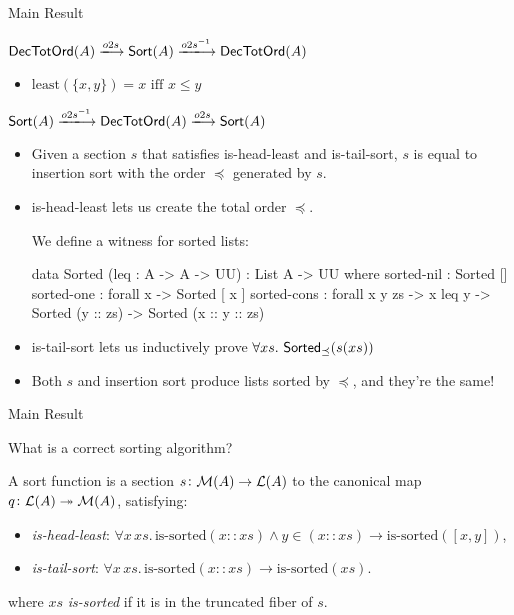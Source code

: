 \documentclass[9pt]{beamer}
\begin{document}
\begin{frame}[fragile]{Main Result}

    $\type{DecTotOrd}(A) \xto{o2s} \type{Sort}(A) \xto{o2s^{-1}} \type{DecTotOrd}(A)$
    \begin{itemize}
        \item $\text{least}(\{x, y\}) = x \text{ iff } x \leq y$
    \end{itemize}

    $\type{Sort}(A) \xto{o2s^{-1}} \type{DecTotOrd}(A) \xto{o2s} \type{Sort}(A)$
    \begin{itemize}
        \item Given a section $s$ that satisfies \alert{is-head-least} and \alert{is-tail-sort},
              $s$ is equal to insertion sort with the order $\preceq$ generated by $s$.
        \item \alert{is-head-least} lets us create the \alert{total order} $\preceq$.
        \begin{dblock}
        We define a witness for sorted lists:
\begin{code}
data Sorted (leq : A -> A -> UU) : List A -> UU where
  sorted-nil : Sorted []
  sorted-one : forall x -> Sorted [ x ]
  sorted-cons : forall x y zs -> x leq y -> Sorted (y :: zs)
            -> Sorted (x :: y :: zs)
\end{code}
          \vspace{1em}
        \end{dblock}
      \item \alert{is-tail-sort} lets us inductively prove $\forall xs.\, \operatorname{\mathsf{Sorted}}_\preceq(s(xs))$
        \item Both $s$ and insertion sort produce lists sorted by $\preceq$, and they're the same!
    \end{itemize}

\end{frame}


\begin{frame}{Main Result}

  \begin{qblock}
    What is a correct sorting algorithm?
  \end{qblock}

  \begin{pblock}[Answer]
  A sort function is a section $s\colon \mathcal{M}(A) \to \mathcal{L}(A)$ to the canonical map $q\colon \mathcal{L}(A) \twoheadrightarrow \mathcal{M}(A)$,
  satisfying:
  \begin{itemize}
      \item \textit{is-head-least}: $\forall x \, xs. \, \text{is-sorted}(x :: xs) \land y \in (x :: xs) \to \text{is-sorted}([x, y])$,
      \item \textit{is-tail-sort}: $\forall x \, xs. \, \text{is-sorted}(x :: xs) \to \text{is-sorted}(xs)$.
  \end{itemize}
  where $xs$ \textit{is-sorted} if it is in the truncated fiber of $s$.
  \end{pblock}
\end{frame}
\end{document}
